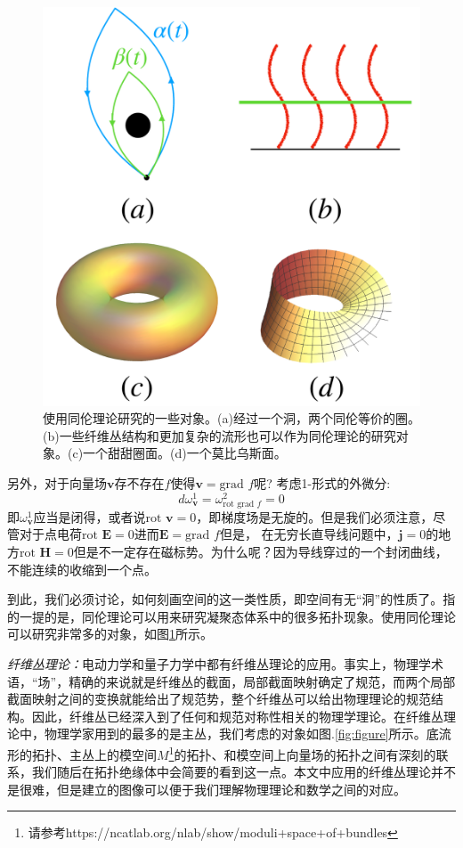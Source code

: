 \documentclass[supercite]{HustGraduPaper}
\newcommand{\bv}{\mathbf{v}}
\begin{document}
\begin{figure}
	\centering
	\includegraphics[width=0.7\linewidth]{Figures/topo}
	\caption{使用同伦理论研究的一些对象。(a)经过一个洞，两个同伦等价的圈。(b)一些纤维丛结构和更加复杂的流形也可以作为同伦理论的研究对象。(c)一个甜甜圈面。(d)一个莫比乌斯面。}
	\label{fig:topo}
\end{figure}
	另外，对于向量场$\bv$存不存在$f$使得$\bv = \text{grad }f$呢? 考虑1-形式的外微分:
	\begin{equation}
	d\omega_{\bv}^{1} = \omega_{\text{rot grad }f}^{2} = 0
	\end{equation}
	即$\omega_{\bv}^{1}$应当是闭得，或者说$\text{rot } \bv = 0$，即梯度场是无旋的。但是我们必须注意，尽管对于点电荷$\text{rot } \mathbf{E} = 0$进而$\mathbf{E}=\text{grad } f$但是，
	在无穷长直导线问题中，$\mathbf{j} = 0$的地方$\text{rot } \mathbf{H} = 0$但是不一定存在磁标势。为什么呢？因为导线穿过的一个封闭曲线，不能连续的收缩到一个点。
	
	到此，我们必须讨论，如何刻画空间的这一类性质，即空间有无“洞”的性质了。指的一提的是，同伦理论可以用来研究凝聚态体系中的很多拓扑现象\cite{avron1983homotopy,kennedy2015homotopy}。使用同伦理论可以研究非常多的对象，如图\ref{fig:topo}所示。
	
	\textit{纤维丛理论：}电动力学和量子力学中都有纤维丛理论的应用。事实上，物理学术语，“场”，精确的来说就是纤维丛的截面，局部截面映射确定了规范，而两个局部截面映射之间的变换就能给出了规范势，整个纤维丛可以给出物理理论的规范结构。因此，纤维丛已经深入到了任何和规范对称性相关的物理学理论。在纤维丛理论中，物理学家用到的最多的是主丛\cite{mohajan2015basic}，我们考虑的对象如图.\ref{fig:figure}所示。底流形的拓扑、主丛上的模空间$M$\footnote{请参考https://ncatlab.org/nlab/show/moduli+space+of+bundles}的拓扑、和模空间上向量场的拓扑之间有深刻的联系，我们随后在拓扑绝缘体中会简要的看到这一点\cite{avron1983homotopy,kennedy2015homotopy}。本文中应用的纤维丛理论并不是很难，但是建立的图像可以便于我们理解物理理论和数学之间的对应。
\end{document}
